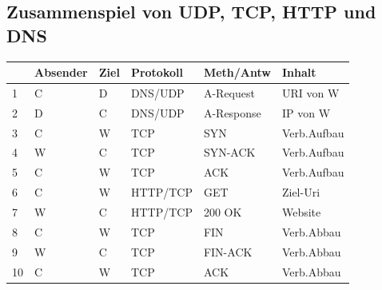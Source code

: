 \subsection{Zusammenspiel von UDP, TCP, HTTP und DNS}
\begin{tabularx}{\textwidth}{|X|X|X|X|X|X|}
\hline
&Absender &Ziel &Protokoll &Meth/Antw &Inhalt\\
\hline
1 &C &D & DNS/UDP &A-Request &URI von W\\
\hline
2 &D &C &DNS/UDP &A-Response &IP von W\\
\hline
3 &C &W &TCP &SYN &Verb.Aufbau\\
\hline
4 &W &C &TCP &SYN-ACK &Verb.Aufbau\\
\hline
5 &C &W &TCP &ACK &Verb.Aufbau\\
\hline
6 &C &W &HTTP/TCP &GET &Ziel-Uri\\
\hline 
7 &W &C &HTTP/TCP &200 OK & Website\\
\hline
8 &C &W &TCP &FIN &Verb.Abbau\\
\hline
9 &W &C &TCP &FIN-ACK &Verb.Abbau\\
\hline
10 &C &W &TCP &ACK &Verb.Abbau\\
\hline
\end{tabularx}